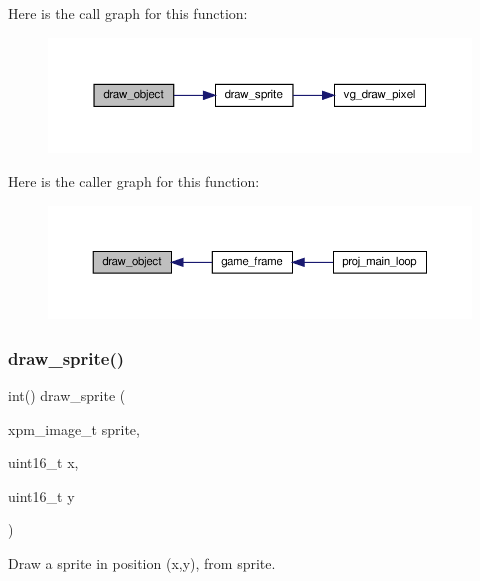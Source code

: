 Here is the call graph for this function\+:\nopagebreak
\begin{figure}[H]
\begin{center}
\leavevmode
\includegraphics[width=350pt]{group__graphics_ga08b3cc962ee64800e139310f91a3d4b4_cgraph}
\end{center}
\end{figure}
Here is the caller graph for this function\+:\nopagebreak
\begin{figure}[H]
\begin{center}
\leavevmode
\includegraphics[width=350pt]{group__graphics_ga08b3cc962ee64800e139310f91a3d4b4_icgraph}
\end{center}
\end{figure}
\mbox{\label{group__graphics_ga7f31f56ddc44fb5e02130bbe4a6c3927}} 
\subsubsection{\texorpdfstring{draw\+\_\+sprite()}{draw\_sprite()}}
{\footnotesize\ttfamily int() draw\+\_\+sprite (\begin{DoxyParamCaption}\item[{xpm\+\_\+image\+\_\+t}]{sprite,  }\item[{uint16\+\_\+t}]{x,  }\item[{uint16\+\_\+t}]{y }\end{DoxyParamCaption})}



Draw a sprite in position (x,y), from sprite. 


